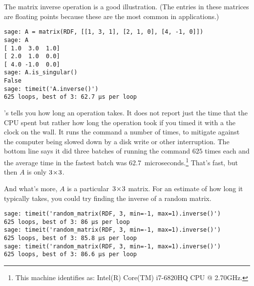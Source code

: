 The matrix inverse operation is a good illustration.
(The entries in these matrices are floating points 
because these are the most common in applications.)
\begin{lstlisting}
sage: A = matrix(RDF, [[1, 3, 1], [2, 1, 0], [4, -1, 0]])
sage: A
[ 1.0  3.0  1.0]
[ 2.0  1.0  0.0]
[ 4.0 -1.0  0.0]
sage: A.is_singular()
False
sage: timeit('A.inverse()')
625 loops, best of 3: 62.7 μs per loop
\end{lstlisting}
\Sage's  tells you how long
an operation takes.
It does not report just the time that the CPU
spent but rather how long the operation took if you timed
it with a the clock on the wall.
It runs the command 
a number of times, to mitigate against the
computer being slowed down by a 
disk write or other interruption.
The bottom line says it did three batches of running the command 
$625$ times each and the average time in the fastest batch
was $62.7$~microseconds.\footnote{%
  This machine 
  identifies as: Intel(R) Core(TM) i7-6820HQ CPU @ 2.70GHz.}
That's fast, but then $A$ is only $3 \! \times \! 3$.

And what's more, $A$ is a particular~$3 \! \times \! 3$ matrix. 
For an estimate of
how long it typically takes,
you could try finding the inverse of a random matrix.
\begin{lstlisting}
sage: timeit('random_matrix(RDF, 3, min=-1, max=1).inverse()')
625 loops, best of 3: 86 μs per loop
sage: timeit('random_matrix(RDF, 3, min=-1, max=1).inverse()')
625 loops, best of 3: 85.8 μs per loop
sage: timeit('random_matrix(RDF, 3, min=-1, max=1).inverse()')
625 loops, best of 3: 86.6 μs per loop
\end{lstlisting}

